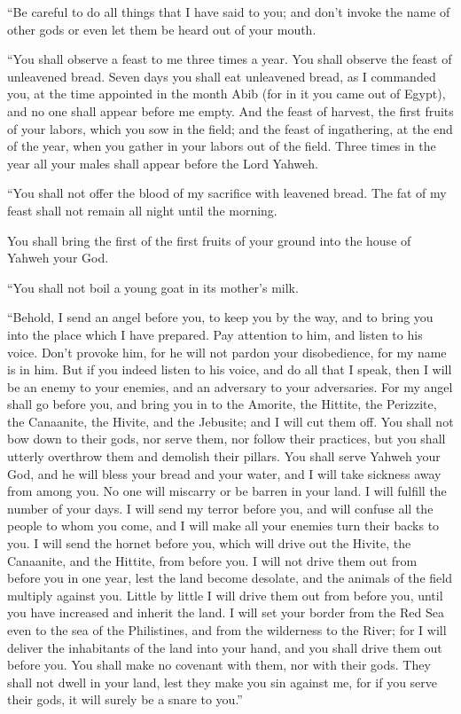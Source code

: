  ``Be careful to do all things that I have said to you;
and don't invoke the name of other gods or even let them be heard out of
your mouth.

 ``You shall observe a feast to me three times a year.
 You shall observe the feast of unleavened bread. Seven
days you shall eat unleavened bread, as I commanded you, at the time
appointed in the month Abib (for in it you came out of Egypt), and no
one shall appear before me empty.  And the feast of
harvest, the first fruits of your labors, which you sow in the field;
and the feast of ingathering, at the end of the year, when you gather in
your labors out of the field.  Three times in the year
all your males shall appear before the Lord Yahweh.

 ``You shall not offer the blood of my sacrifice with
leavened bread. The fat of my feast shall not remain all night until the
morning.

 You shall bring the first of the first fruits of your
ground into the house of Yahweh your God.

``You shall not boil a young goat in its mother's milk.

 ``Behold, I send an angel before you, to keep you by the
way, and to bring you into the place which I have prepared.
 Pay attention to him, and listen to his voice. Don't
provoke him, for he will not pardon your disobedience, for my name is in
him.  But if you indeed listen to his voice, and do all
that I speak, then I will be an enemy to your enemies, and an adversary
to your adversaries.  For my angel shall go before you,
and bring you in to the Amorite, the Hittite, the Perizzite, the
Canaanite, the Hivite, and the Jebusite; and I will cut them off.
 You shall not bow down to their gods, nor serve them,
nor follow their practices, but you shall utterly overthrow them and
demolish their pillars.  You shall serve Yahweh your God,
and he will bless your bread and your water, and I will take sickness
away from among you.  No one will miscarry or be barren
in your land. I will fulfill the number of your days.  I
will send my terror before you, and will confuse all the people to whom
you come, and I will make all your enemies turn their backs to you.
 I will send the hornet before you, which will drive out
the Hivite, the Canaanite, and the Hittite, from before you.
 I will not drive them out from before you in one year,
lest the land become desolate, and the animals of the field multiply
against you.  Little by little I will drive them out from
before you, until you have increased and inherit the land.
 I will set your border from the Red Sea even to the sea
of the Philistines, and from the wilderness to the River; for I will
deliver the inhabitants of the land into your hand, and you shall drive
them out before you.  You shall make no covenant with
them, nor with their gods.  They shall not dwell in your
land, lest they make you sin against me, for if you serve their gods, it
will surely be a snare to you.''

